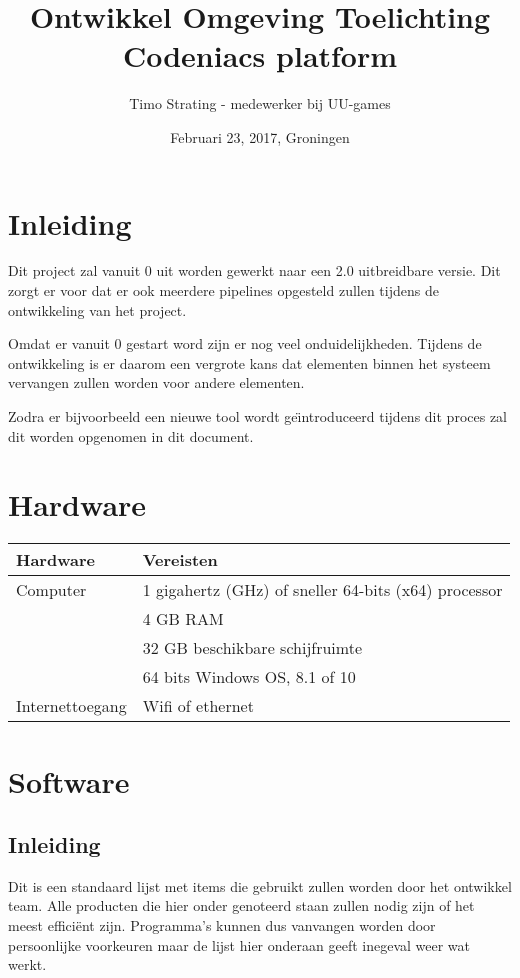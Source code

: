 \documentclass[]{report}
\title{Ontwikkel Omgeving Toelichting Codeniacs platform}
\author{Timo Strating - medewerker bij UU-games}
\date{Februari 23, 2017, Groningen}
\begin{document}
\maketitle

\tableofcontents
\newpage






\chapter{Inleiding}

Dit project zal vanuit 0 uit worden gewerkt naar een 2.0 uitbreidbare versie. Dit zorgt er voor dat er ook meerdere pipelines opgesteld zullen tijdens de ontwikkeling van het project. 

Omdat er vanuit 0 gestart word zijn er nog veel onduidelijkheden. Tijdens de ontwikkeling is er daarom een vergrote kans dat elementen binnen het systeem vervangen zullen worden voor andere elementen. 

Zodra er bijvoorbeeld een nieuwe tool wordt ge\"{\i}ntroduceerd tijdens dit proces zal dit worden opgenomen in dit document.





\chapter{Hardware}

\begin{tabular}{ l p{8cm} }
	\textbf{Hardware} & \textbf{Vereisten} \\ \hline
	Computer	&	1 gigahertz (GHz) of sneller 64-bits (x64) processor \\
	 & 4 GB RAM \\
	 & 32 GB beschikbare schijfruimte \\
	 & 64 bits Windows OS, 8.1 of 10 \\
	Internettoegang	 &	Wifi of ethernet \\
\end{tabular}




\chapter{Software}

\section{Inleiding}
Dit is een standaard lijst met items die gebruikt zullen worden door het ontwikkel team. Alle producten die hier onder genoteerd staan zullen nodig zijn of het meest effici\"{e}nt zijn. Programma's kunnen dus vanvangen worden door persoonlijke voorkeuren maar de lijst hier onderaan geeft inegeval weer wat werkt. 
\end{document}
